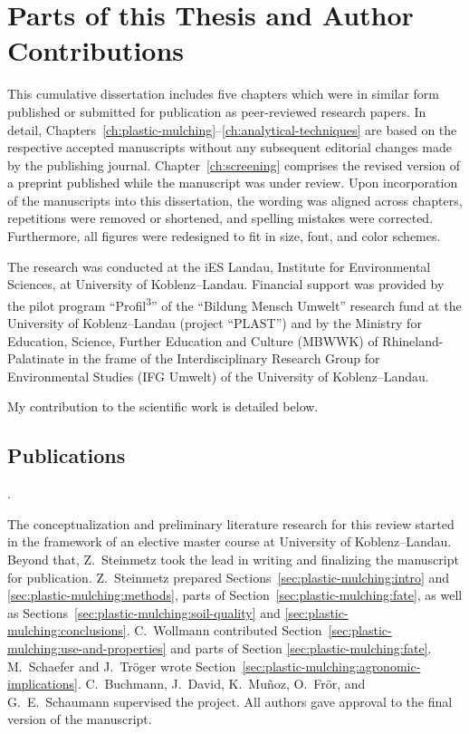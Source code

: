 
\chapter{Parts of this Thesis and Author Contributions}
\label{ch:author-contributions}

This cumulative dissertation includes five chapters which were in similar form published or submitted for publication as peer-reviewed research papers.
In detail, Chapters~\ref{ch:plastic-mulching}--\ref{ch:analytical-techniques} are based on the respective accepted manuscripts without any subsequent editorial changes made by the publishing journal. Chapter~\ref{ch:screening} comprises the revised version of a preprint published while the manuscript was under review.
Upon incorporation of the manuscripts into this dissertation, the wording was aligned across chapters, repetitions were removed or shortened, and spelling mistakes were corrected. Furthermore, all figures were redesigned to fit in size, font, and color schemes.

The research was conducted at the iES Landau, Institute for Environmental Sciences, at University of Koblenz--Landau. Financial support was provided by the pilot program ``Profil\textsuperscript{3}'' of the ``Bildung Mensch Umwelt'' research fund at the University of Koblenz--Landau (project ``PLAST'') and by the Ministry for Education, Science, Further Education and Culture (MBWWK) of Rhineland-Palatinate in the frame of the Interdisciplinary Research Group for Environmental Studies (IFG Umwelt) of the University of Koblenz--Landau.

My contribution to the scientific work is detailed below.

\section*{Publications}

\vspace{0.5\baselineskip}
\noindent{}.

\begin{description}
	\setlength\itemsep{0em}
	\item[Author contributions:] The conceptualization and preliminary literature research for this review started in the framework of an elective master course at University of Koblenz--Landau. Beyond that, Z.~Steinmetz took the lead in writing and finalizing the manuscript for publication. Z.~Steinmetz prepared Sections~\ref{sec:plastic-mulching:intro} and \ref{sec:plastic-mulching:methods}, parts of Section~\ref{sec:plastic-mulching:fate}, as well as Sections~\ref{sec:plastic-mulching:soil-quality} and \ref{sec:plastic-mulching:conclusions}. C.~Wollmann contributed Section~\ref{sec:plastic-mulching:use-and-properties} and parts of Section \ref{sec:plastic-mulching:fate}. M.~Schaefer and J.~Tröger wrote Section~\ref{sec:plastic-mulching:agronomic-implications}. C.~Buchmann, J.~David, K.~Muñoz, O.~Frör, and G.~E.~Schaumann supervised the project. All authors gave approval to the final version of the manuscript.
\end{description}

